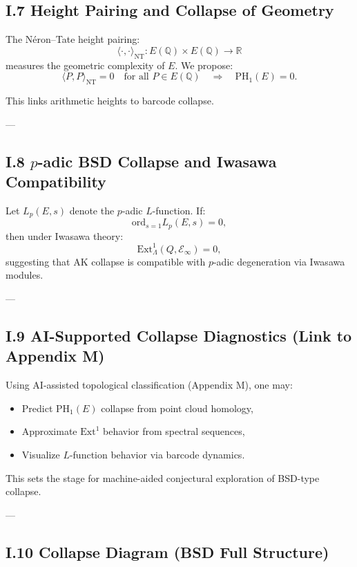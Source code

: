 \documentclass[11pt]{article}
\begin{document}
\subsection*{I.7 Height Pairing and Collapse of Geometry}

The Néron–Tate height pairing:
\[
\langle\cdot,\cdot\rangle_{\text{NT}} : E(\mathbb{Q}) \times E(\mathbb{Q}) \to \mathbb{R}
\]
measures the geometric complexity of $E$.  
We propose:
\[
\langle P,P \rangle_{\text{NT}} = 0 \quad \text{for all } P \in E(\mathbb{Q}) \quad \Rightarrow \quad \text{PH}_1(E) = 0.
\]

This links arithmetic heights to barcode collapse.

---

\subsection*{I.8 $p$-adic BSD Collapse and Iwasawa Compatibility}

Let $L_p(E,s)$ denote the $p$-adic $L$-function.  
If:
\[
\mathrm{ord}_{s=1} L_p(E,s) = 0,
\]
then under Iwasawa theory:
\[
\mathrm{Ext}^1_{\Lambda}(Q, \mathcal{E}_\infty) = 0,
\]
suggesting that AK collapse is compatible with $p$-adic degeneration via Iwasawa modules.

---

\subsection*{I.9 AI-Supported Collapse Diagnostics (Link to Appendix M)}

Using AI-assisted topological classification (Appendix M), one may:
\begin{itemize}
  \item Predict $\mathrm{PH}_1(E)$ collapse from point cloud homology,
  \item Approximate $\mathrm{Ext}^1$ behavior from spectral sequences,
  \item Visualize $L$-function behavior via barcode dynamics.
\end{itemize}

This sets the stage for machine-aided conjectural exploration of BSD-type collapse.

---

\subsection*{I.10 Collapse Diagram (BSD Full Structure)}
\end{document}
